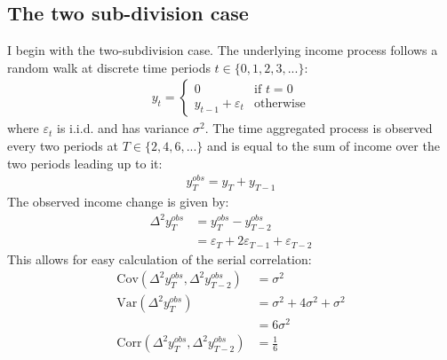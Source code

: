 \documentclass[titlepage]{\econtex}\newcommand{\texname}{BPP_TimeAgg}
\begin{document}
\subsection{The two sub-division case}
I begin with the two-subdivision case. The underlying income process follows a random walk at discrete time periods $t\in \{0,1,2,3,...\}$:
\begin{align*}
y_t = \begin{cases}
0 \qquad & \text{if } t=0\\
	y_{t-1} + \varepsilon_t & \text{otherwise}
	\end{cases}
\end{align*}
where $\varepsilon_t$ is i.i.d. and has variance $\sigma^2$. The  time aggregated process is observed every two periods at $T\in\{2,4,6,...\}$ and is equal to the sum of income over the two periods leading up to it:
\begin{align*}
y_T^{obs} = y_T + y_{T-1}
\end{align*}
The observed income change is given by:
\begin{align*}
\Delta^2 y_T^{obs} &= y_T^{obs} - y_{T-2}^{obs} \\
&= \varepsilon_T + 2\varepsilon_{T-1} + \varepsilon_{T-2}
\end{align*}
This allows for easy calculation of the serial correlation:
\begin{align*}
\mathrm{Cov}(\Delta^2 y_T^{obs},\Delta^2 y_{T-2}^{obs}) &= \sigma^2 \\
\mathrm{Var}(\Delta^2 y_T^{obs}) &= \sigma^2 + 4\sigma^2 + \sigma^2 \\
&= 6\sigma^2 \\
\mathrm{Corr}(\Delta^2 y_T^{obs},\Delta^2 y_{T-2}^{obs}) &= \frac{1}{6}
\end{align*}
\end{document}
